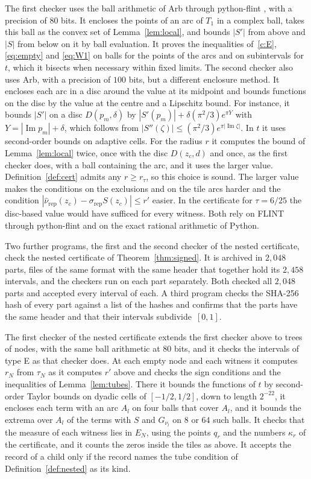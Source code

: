 \documentclass[11pt]{amsart}
\theoremstyle{definition}
\theoremstyle{remark}
\numberwithin{equation}{section}
\newcommand{\im}{\operatorname{Im}}
\begin{document}
The first checker uses the ball arithmetic of Arb \cite{Joh17} through python-flint \cite{pyflint}, with a precision of $80$ bits. It encloses the points of an arc of $T_1$ in a complex ball, takes this ball as the convex set of Lemma~\ref{lem:local}, and bounds $|S'|$ from above and $|S|$ from below on it by ball evaluation. It proves the inequalities of~\ref{c:E}, \eqref{eq:empty} and \eqref{eq:W1} on balls for the points of the arcs and on subintervals for $t$, which it bisects when necessary within fixed limits. The second checker also uses Arb, with a precision of $100$ bits, but a different enclosure method. It encloses each arc in a disc around the value at its midpoint and bounds functions on the disc by the value at the centre and a Lipschitz bound. For instance, it bounds $|S'|$ on a disc $D(p_m,\delta)$ by $|S'(p_m)|+\delta(\pi^2/3)e^{\pi Y}$ with $Y=|\im p_m|+\delta$, which follows from $|S''(\zeta)|\le(\pi^2/3)e^{\pi|\im\zeta|}$. In $t$ it uses second-order bounds on adaptive cells. For the radius $r$ it computes the bound of Lemma~\ref{lem:local} twice, once with the disc $D(z_c,d)$ and once, as the first checker does, with a ball containing the arc, and it uses the larger value. Definition~\ref{def:cert} admits any $r\ge r_\tau$, so this choice is sound. The larger value makes the conditions on the exclusions and on the tile arcs harder and the condition $|\hat\nu_{\mathrm{rep}}(z_c)-\sigma_{\mathrm{rep}}S(z_c)|\le r'$ easier. In the certificate for $\tau=6/25$ the disc-based value would have sufficed for every witness. Both rely on FLINT through python-flint and on the exact rational arithmetic of Python.

Two further programs, the first and the second checker of the nested certificate, check the nested certificate of Theorem~\ref{thm:signed}. It is archived in $2{,}048$ parts, files of the same format with the same header that together hold its $2{,}458$ intervals, and the checkers run on each part separately. Both checked all $2{,}048$ parts and accepted every interval of each. A third program checks the SHA-256 hash of every part against a list of the hashes and confirms that the parts have the same header and that their intervals subdivide~$[0,1]$.

The first checker of the nested certificate extends the first checker above to trees of nodes, with the same ball arithmetic at $80$ bits, and it checks the intervals of type E as that checker does. At each empty node and each witness it computes $r_N$ from $\tau_N$ as it computes $r'$ above and checks the sign conditions and the inequalities of Lemma~\ref{lem:tubes}. There it bounds the functions of $t$ by second-order Taylor bounds on dyadic cells of $[-1/2,1/2]$, down to length $2^{-22}$, it encloses each term with an arc $A_l$ on four balls that cover $A_l$, and it bounds the extrema over $A_l$ of the terms with $S$ and $G_{\nu_l}$ on $8$ or $64$ such balls. It checks that the measure of each witness lies in $E_N$, using the points $q_r$ and the numbers $\kappa_r$ of the certificate, and it counts the zeros inside the tiles as above. It accepts the record of a child only if the record names the tube condition of Definition~\ref{def:nested} as its kind.
\end{document}
